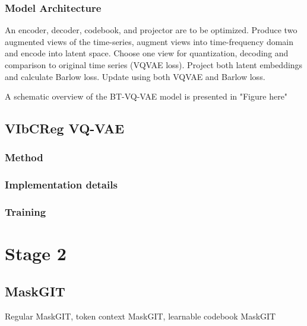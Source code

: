 \documentclass[../../thesis.tex]{subfiles}
\begin{document}
\subsubsection{Model Architecture}


An encoder, decoder, codebook, and projector are to be optimized. Produce two augmented views of the time-series, augment views into time-frequency domain and encode into latent space. Choose one view for quantization, decoding and comparison to original time series (VQVAE loss). Project both latent embeddings and calculate Barlow loss. Update using both VQVAE and Barlow loss.

A schematic overview of the BT-VQ-VAE model is presented in "Figure here"



\subsection{VIbCReg VQ-VAE}

\subsubsection{Method}

\subsubsection{Implementation details}

\subsubsection{Training}

\section{Stage 2}

\subsection{MaskGIT}
Regular MaskGIT, token context MaskGIT, learnable codebook MaskGIT
\end{document}
